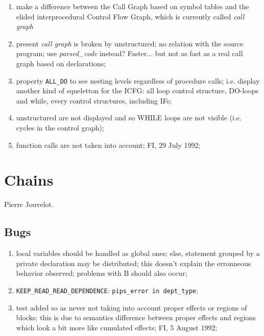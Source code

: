 \begin{enumerate}

  \item make a difference between the Call Graph based on symbol tables
	and the elided interprocedural Control Flow Graph, which is
	currently called {\em call graph}

  \item present {\em call graph} is broken by
	unstructured; no relation with the source program; use {\em
	parsed\_code} instead? Faster... but not as fast as a real call
	graph based on declarations; 

  \item property \verb+ALL_DO+ to see nesting levels regardless of procedure
 	calls; i.e. display another kind of squeletton for the ICFG:
        all loop control structure, DO-loops and while, every control
	structures, including IFs;

  \item unstructured are not displayed and so WHILE loops are not
	visible (i.e. cycles in the control graph);

  \item function calls are not taken into account; FI, 29 July 1992;

\end{enumerate}

\section{Chains}

Pierre Jouvelot.

\subsection{Bugs}

\begin{enumerate}

  \item local variables should be handled as global ones; else,
	statement grouped by a private declaration may be distributed;
	this doesn't explain the erronneous behavior observed; problems with
	B should also occur;

  \item \verb+KEEP_READ_READ_DEPENDENCE+: \verb+pips_error in dept_type+;

  \item test added so as never not taking into account proper effects or
	regions of blocks; this is due to semantics difference between
	proper effects and regions which look a bit more like cumulated
	effects; FI, 5 August 1992;

\end{enumerate}

